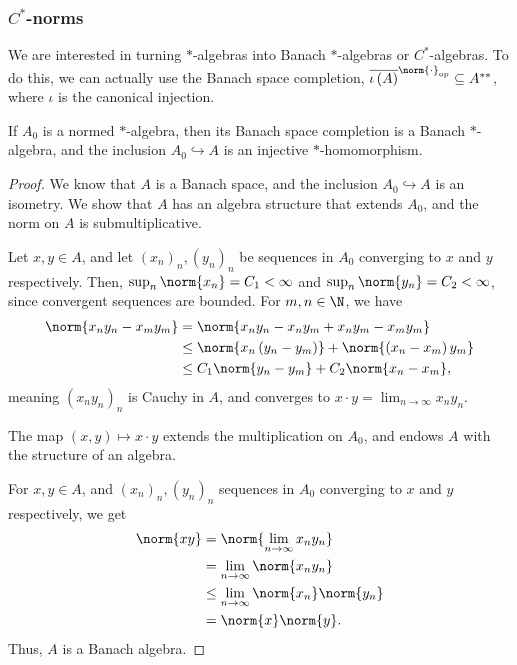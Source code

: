 \documentclass[10pt]{mypackage}
\begin{document}
\subsubsection{$C^{\ast}$-norms}%
We are interested in turning $\ast$-algebras into Banach $\ast$-algebras or $C^{\ast}$-algebras. To do this, we can actually use the Banach space completion, $\overline{\iota\left(A\right)}^{\norm{\cdot}_{\text{op}}}\subseteq A^{\ast\ast}$, where $\iota$ is the canonical injection.
\begin{lemma}
  If $A_0$ is a normed $\ast$-algebra, then its Banach space completion is a Banach $\ast$-algebra, and the inclusion $A_0\hookrightarrow A$ is an injective $\ast$-homomorphism.
\end{lemma}
\begin{proof}
  We know that $A$ is a Banach space, and the inclusion $A_0\hookrightarrow A$ is an isometry. We show that $A$ has an algebra structure that extends $A_0$, and the norm on $A$ is submultiplicative.\newline

  Let $x,y\in A$, and let $\left(x_n\right)_n,\left(y_n\right)_n$ be sequences in $A_0$ converging to $x$ and $y$ respectively. Then, $\sup_{n}\norm{x_n} = C_1 < \infty$ and $\sup_{n}\norm{y_n} = C_2 < \infty$, since convergent sequences are bounded. For $m,n\in \N$, we have
  \begin{align*}
    \norm{x_ny_n - x_my_m} &= \norm{x_ny_n - x_ny_m + x_ny_m - x_my_m}\\
                           &\leq \norm{x_n\left(y_n - y_m\right)} + \norm{\left(x_n-x_m\right)y_m}\\
                           &\leq C_1\norm{y_n - y_m} + C_2\norm{x_n - x_m},
  \end{align*}
  meaning $\left(x_ny_n\right)_n$ is Cauchy in $A$, and converges to $x\cdot y = \lim_{n\rightarrow\infty}x_ny_n$.\newline

  The map $\left(x,y\right) \mapsto x\cdot y$ extends the multiplication on $A_0$, and endows $A$ with the structure of an algebra.\newline

  For $x,y\in A$, and $\left(x_n\right)_n,\left(y_n\right)_n$ sequences in $A_0$ converging to $x$ and $y$ respectively, we get
  \begin{align*}
    \norm{xy} &= \norm{\lim_{n\rightarrow\infty}x_ny_n}\\
              &= \lim_{n\rightarrow\infty}\norm{x_ny_n}\\
              &\leq \lim_{n\rightarrow\infty}\norm{x_n}\norm{y_n}\\
              &= \norm{x}\norm{y}.
  \end{align*}
  Thus, $A$ is a Banach algebra.\newline


\end{proof}
\end{document}
